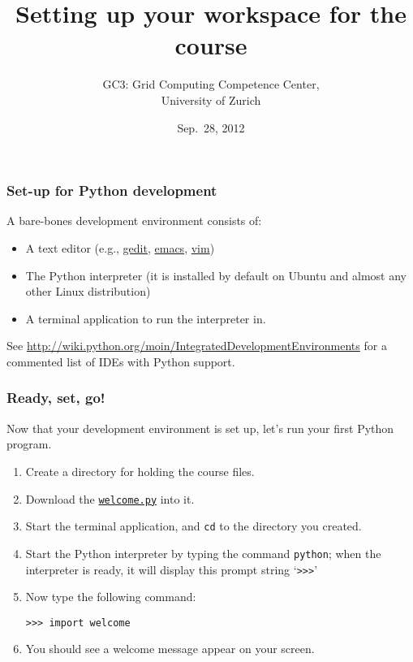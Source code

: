 \documentclass[english,serif,mathserif,xcolor=pdftex,dvipsnames,table]{beamer}
\title[Set-up]{%
  Setting up your workspace for the course
}
\author[GC3]{%
  GC3: Grid Computing Competence Center, \\
  University of Zurich
}
\date{Sep.~28, 2012}
\begin{document}
\maketitle


\begin{frame}
  \frametitle{Set-up for Python development}
  A bare-bones development environment consists of:
  \begin{itemize}
  \item A text editor (e.g.,
    \href{http://en.wikipedia.org/wiki/Gedit}{gedit}, 
    \href{http://hide1713.wordpress.com/2009/01/30/setup-perfect-python-environment-in-emacs/}{emacs},
    \href{http://blog.dispatched.ch/2009/05/24/vim-as-python-ide/}{vim})
  \item The Python interpreter (it is installed by default on
    Ubuntu and almost any other Linux distribution)
  \item A terminal application to run the interpreter in.
  \end{itemize}

  \+ See
  {\small \url{http://wiki.python.org/moin/IntegratedDevelopmentEnvironments}}
  for a commented list of {IDEs} with Python support.
\end{frame}


\begin{frame}[fragile]
  \frametitle{Ready, set, go!}

  Now that your development environment is set up, let's run your
  first Python program.
  \begin{enumerate}
  \item Create a directory for holding the course files.
  \item Download the \href{http://www.gc3.uzh.ch/welcome.py}{\texttt{welcome.py}} into it.
  \item Start the terminal application, and \texttt{cd} to the directory you created.
  \item Start the Python interpreter by typing the command \texttt{python}; when the interpreter is ready, it will display this prompt string `\texttt{>>>}'
  \item Now type the following command:
    \begin{lstlisting}
>>> import welcome      
    \end{lstlisting}
  \item You should see a welcome message appear on your screen.
  \end{enumerate}
  
\end{frame}
\end{document}
